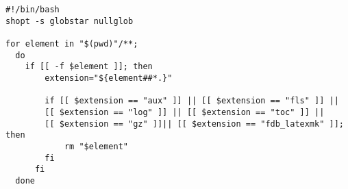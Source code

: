\documentclass{article}
\begin{document}


\newpage

\begin{lstlisting}[caption={Mon script Bash}]
    #!/bin/bash
shopt -s globstar nullglob

for element in "$(pwd)"/**;
  do 
    if [[ -f $element ]]; then  
        extension="${element##*.}"

        if [[ $extension == "aux" ]] || [[ $extension == "fls" ]] ||
        [[ $extension == "log" ]] || [[ $extension == "toc" ]] || 
        [[ $extension == "gz" ]]|| [[ $extension == "fdb_latexmk" ]]; then 
            rm "$element"
        fi
      fi
  done
\end{lstlisting}
\end{document}
